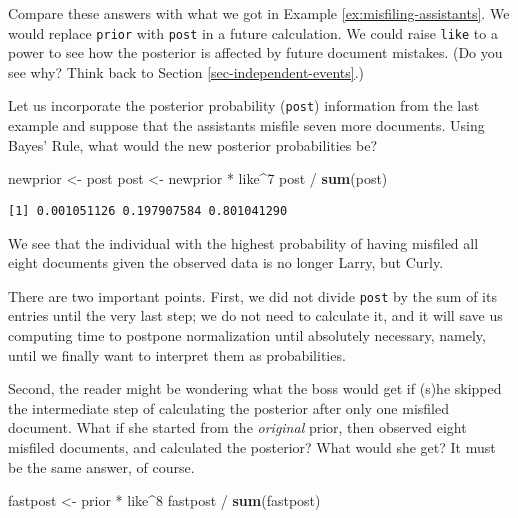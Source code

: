 \documentclass[]{book}
\newenvironment{Shaded}{\begin{snugshade}}{\end{snugshade}}
\newcommand{\KeywordTok}[1]{\textcolor[rgb]{0.13,0.29,0.53}{\textbf{{#1}}}}
\newcommand{\DecValTok}[1]{\textcolor[rgb]{0.00,0.00,0.81}{{#1}}}
\newcommand{\StringTok}[1]{\textcolor[rgb]{0.31,0.60,0.02}{{#1}}}
\newcommand{\NormalTok}[1]{{#1}}
\numberwithin{equation}{chapter}
\numberwithin{figure}{chapter}
\theoremstyle{plain}
\theoremstyle{definition}
\theoremstyle{remark}
\theoremstyle{definition}
\theoremstyle{definition}
\theoremstyle{remark}
\let\BeginKnitrBlock\begin \let\EndKnitrBlock\end
\begin{document}
Compare these answers with what we got in Example
\ref{ex:misfiling-assistants}. We would replace \texttt{prior} with
\texttt{post} in a future calculation. We could raise \texttt{like} to a
power to see how the posterior is affected by future document mistakes.
(Do you see why? Think back to Section \ref{sec-independent-events}.)

\bigskip

\BeginKnitrBlock{example}
\protect\hypertarget{ex:unnamed-chunk-180}{}{\label{ex:unnamed-chunk-180}}Let
us incorporate the posterior probability (\texttt{post}) information
from the last example and suppose that the assistants misfile seven more
documents. Using Bayes' Rule, what would the new posterior probabilities
be?
\EndKnitrBlock{example}

\begin{Shaded}
\begin{Highlighting}[]
\NormalTok{newprior <-}\StringTok{ }\NormalTok{post}
\NormalTok{post <-}\StringTok{ }\NormalTok{newprior *}\StringTok{ }\NormalTok{like^}\DecValTok{7}
\NormalTok{post /}\StringTok{ }\KeywordTok{sum}\NormalTok{(post)}
\end{Highlighting}
\end{Shaded}

\begin{verbatim}
[1] 0.001051126 0.197907584 0.801041290
\end{verbatim}

We see that the individual with the highest probability of having
misfiled all eight documents given the observed data is no longer Larry,
but Curly.

There are two important points. First, we did not divide \texttt{post}
by the sum of its entries until the very last step; we do not need to
calculate it, and it will save us computing time to postpone
normalization until absolutely necessary, namely, until we finally want
to interpret them as probabilities.

Second, the reader might be wondering what the boss would get if (s)he
skipped the intermediate step of calculating the posterior after only
one misfiled document. What if she started from the \emph{original}
prior, then observed eight misfiled documents, and calculated the
posterior? What would she get? It must be the same answer, of course.

\begin{Shaded}
\begin{Highlighting}[]
\NormalTok{fastpost <-}\StringTok{ }\NormalTok{prior *}\StringTok{ }\NormalTok{like^}\DecValTok{8}
\NormalTok{fastpost /}\StringTok{ }\KeywordTok{sum}\NormalTok{(fastpost)}
\end{Highlighting}
\end{Shaded}
\end{document}
